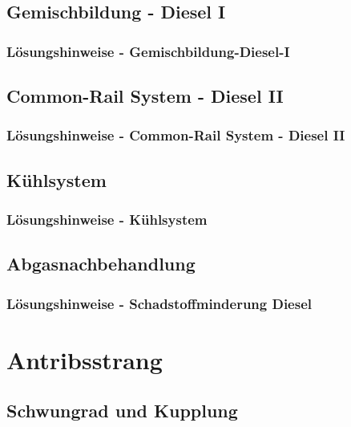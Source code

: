 \chapter{Gemischbildung - Diesel I}
 \newpage
\section{Lösungshinweise - Gemischbildung-Diesel-I}

\chapter{Common-Rail System - Diesel II}
 \newpage
\section{Lösungshinweise - Common-Rail System - Diesel II}

\chapter{Kühlsystem}
 \newpage
\section{Lösungshinweise - Kühlsystem}

\chapter{Abgasnachbehandlung}
 \newpage
\section{Lösungshinweise - Schadstoffminderung Diesel}





\part{Antribsstrang}
\chapter{Schwungrad und Kupplung}
 \newpage
